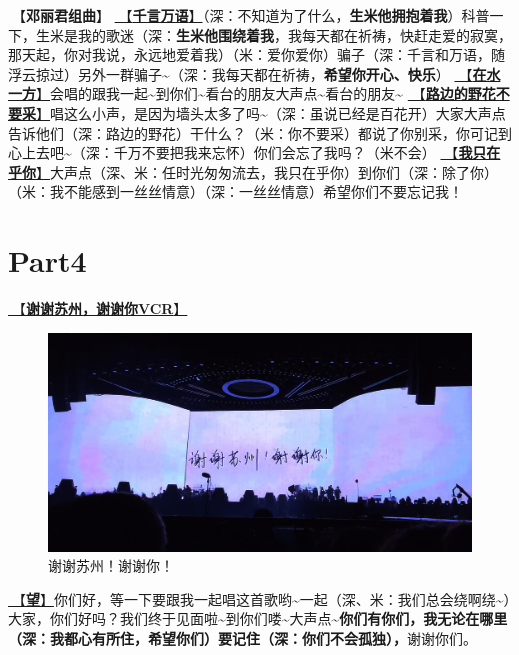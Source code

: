 \documentclass[]{ctexbook}
\begin{document}
🎵【\textbf{邓丽君组曲}】
\hyperref[thousands-of-words]{🎵【\textbf{千言万语}】}（深：不知道为了什么，\textbf{生米他拥抱着我}）科普一下，生米是我的歌迷（深：\textbf{生米他围绕着我}，我每天都在祈祷，快赶走爱的寂寞，那天起，你对我说，永远地爱着我）（米：爱你爱你）骗子（深：千言和万语，随浮云掠过）另外一群骗子\textasciitilde（深：我每天都在祈祷，\textbf{希望你开心、快乐}）
\hyperref[on-the-water-side]{🎵【\textbf{在水一方}】}会唱的跟我一起\textasciitilde 到你们\textasciitilde 看台的朋友大声点\textasciitilde 看台的朋友\textasciitilde{}
\hyperref[only-with-me]{🎵【\textbf{路边的野花不要采}】}唱这么小声，是因为墙头太多了吗\textasciitilde（深：虽说已经是百花开）大家大声点告诉他们（深：路边的野花）干什么？（米：你不要采）都说了你别采，你可记到心上去吧\textasciitilde（深：千万不要把我来忘怀）你们会忘了我吗？（米不会）
\hyperref[only-you]{🎵【\textbf{我只在乎你}】}大声点（深、米：任时光匆匆流去，我只在乎你）到你们（深：除了你）（米：我不能感到一丝丝情意）（深：一丝丝情意）希望你们不要忘记我！

\newpage

\section{Part4}\label{suzhou-20241109-part4}

\hyperref[thank-you-vcr]{🎥【\textbf{谢谢苏州，谢谢你VCR}】}

\begin{figure}

{\centering \includegraphics[width=400pt]{img/suzhou20241109/thank-suzhou} 

}

\caption{谢谢苏州！谢谢你！}\label{fig:unnamed-chunk-129}
\end{figure}

\hyperref[Gaze]{🎵【\textbf{望}】}你们好，等一下要跟我一起唱这首歌哟\textasciitilde 一起（深、米：我们总会绕啊绕\textasciitilde）大家，你们好吗？我们终于见面啦\textasciitilde 到你们喽\textasciitilde 大声点\textasciitilde{}\textbf{你们有你们，我无论在哪里（深：我都心有所住，希望你们）要记住（深：你们不会孤独），}谢谢你们。
\end{document}
